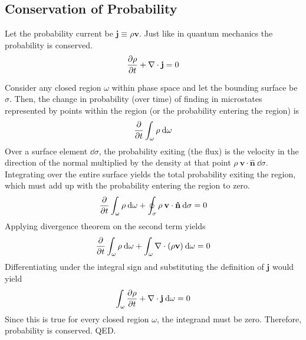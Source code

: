 \documentclass{article}
\newcommand{\ve}{\mathbf}
\begin{document}
\subsection{Conservation of Probability}
\begin{proposition}
    Let the probability current be $\ve j\equiv \rho\ve v$. Just like in quantum mechanics the probability is conserved.
    \begin{equation}
        \partialderivative{\rho}{t}+\nabla\cdot\ve j=0\label{conservation:probability}
    \end{equation}
\end{proposition}
\begin{prooof}
    Consider any closed region $\omega$ within phase space and let the bounding surface be $\sigma$. Then, the change in probability (over time) of finding in microstates represented by points within the region (or the probability entering the region) is 
    \begin{equation}
        \partialderivative{}{t}\int_\omega \rho\:\dd\omega
    \end{equation}
    Over a surface element $\dd\sigma$, the probability exiting (the flux) is the velocity in the direction of the normal multiplied by the density at that point $\rho\:\ve v\cdot\ve{\hat{n}}\:\dd\sigma$. Integrating over the entire surface yields the total probability exiting the region, which must add up with the probability entering the region to zero.
    \begin{equation}
        \partialderivative{}{t}\int_\omega\rho\:\dd\omega+\oint_\sigma \rho\:\ve v\cdot\ve{\hat{n}}\:\dd\sigma=0
    \end{equation}
    Applying divergence theorem on the second term yields
    \begin{equation}
        \partialderivative{}{t}\int_\omega\rho\:\dd\omega+\int_\omega\nabla\cdot(\rho\ve v)\:\dd\omega=0
    \end{equation}
    Differentiating under the integral sign and substituting the definition of $\ve j$ would yield
    \begin{equation}
        \int_\omega\partialderivative{\rho}{t}+\nabla\cdot\ve j\:\dd\omega=0
    \end{equation}
    Since this is true for every closed region $\omega$, the integrand must be zero. Therefore, probability is conserved. QED.
\end{prooof}
\end{document}
